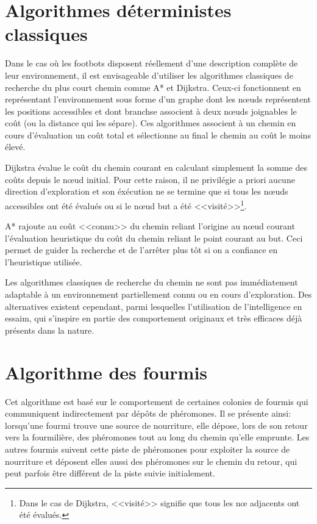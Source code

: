 \section{Algorithmes déterministes classiques}

Dans le cas où les footbots disposent réellement d'une description complète de leur environnement, il est envisageable d'utiliser les algorithmes classiques de recherche du plus court chemin comme A* et Dijkstra. Ceux-ci fonctionnent en représentant l'environnement sous forme d'un graphe dont les n\oe{}uds représentent les positions accessibles et dont branchse associent à deux n\oe{}uds joignables le coût (ou la distance qui les sépare). Ces algorithmes associent à un chemin en cours d'évaluation un coût total et sélectionne au final le chemin au coût le moins élevé.

Dijkstra évalue le coût du chemin courant en calculant simplement la somme des coûts depuis le n\oe{}ud initial. Pour cette raison, il ne privilégie a priori aucune direction d'exploration et son éxécution ne se termine que si tous les n\oe{}uds accessibles ont été évalués ou si le n\oe{}ud but a été <<visité>>\footnote{Dans le cas de Dijkstra, <<visité>> signifie que tous les n\oe{} adjacents ont été évalués.}.

A* rajoute au coût <<connu>> du chemin reliant l'origine au n\oe{}ud courant l'évaluation heuristique du coût du chemin reliant le point courant au but. Ceci permet de guider la recherche et de l'arrêter plus tôt si on a confiance en l'heuristique utilisée.

Les algorithmes classiques de recherche du chemin ne sont pas immédiatement adaptable à un environnement partiellement connu ou en cours d'exploration. Des alternatives existent cependant, parmi lesquelles l'utilisation de l'intelligence en essaim, qui s'inspire en partie  des comportement originaux et très efficaces déjà présents dans la nature.

\section{Algorithme des fourmis}

Cet algorithme est basé sur le comportement de certaines colonies de fourmis qui communiquent indirectement par dépôts de phéromones. Il se présente ainsi: lorsqu'une fourmi trouve une source de nourriture, elle dépose, lors de son retour vers la fourmilière, des phéromones tout au long du chemin qu'elle emprunte. Les autres fourmis suivent cette piste de phéromones pour exploiter la source de nourriture et déposent elles aussi des phéromones sur le chemin du retour, qui peut parfois être différent de la piste suivie initialement.

